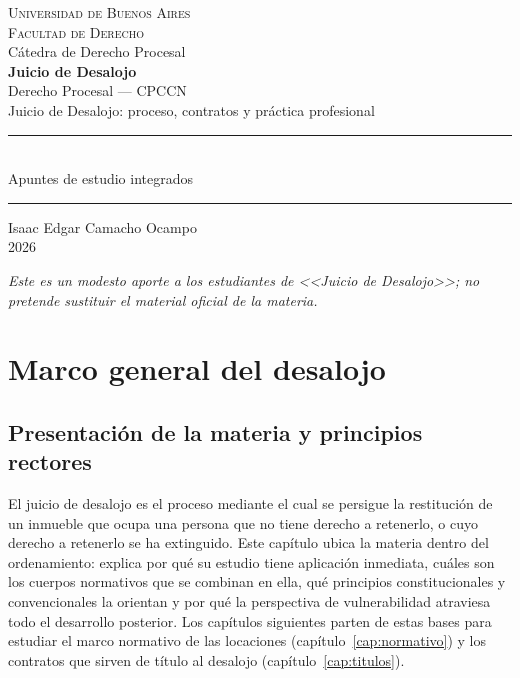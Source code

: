 \documentclass[12pt,oneside]{book}
\newcommand{\universidad}{Universidad de Buenos Aires}
\newcommand{\facultad}{Facultad de Derecho}
\newcommand{\catedra}{Cátedra de Derecho Procesal}
\newcommand{\materia}{Juicio de Desalojo}
\newcommand{\submateria}{Derecho Procesal --- CPCCN}
\newcommand{\titulo}{Juicio de Desalojo: proceso, contratos y práctica profesional}
\newcommand{\autor}{Isaac Edgar Camacho Ocampo}
\newcommand{\anio}{2026}
\begin{document}
\begin{titlepage}
\thispagestyle{empty}
\begin{center}
\vspace*{1cm}
{\large \textsc{\universidad}}\\[0.2cm]
{\large \textsc{\facultad}}\\[0.2cm]
{\large \catedra}\\[3cm]
{\Huge \textbf{\materia}}\\[0.4cm]
{\normalsize \submateria}\\[1cm]
{\LARGE \titulo}\\[1.2cm]
\rule{0.70\textwidth}{0.5pt}\\[0.5cm]
{\large Apuntes de estudio integrados}\\[0.5cm]
\rule{0.70\textwidth}{0.5pt}
\vfill
{\large \autor}\\[0.3cm]
{\large \anio}
\end{center}
\vfill
\begin{flushleft}
\textit{Este es un modesto aporte a los estudiantes de <<\materia>>; no pretende sustituir el material oficial de la materia.}
\end{flushleft}
\end{titlepage}

\frontmatter
\tableofcontents

\mainmatter
\part{Marco general del desalojo}

\chapter{Presentación de la materia y principios rectores}\label{cap:principios}

El juicio de desalojo es el proceso mediante el cual se persigue la restitución de un inmueble que ocupa una persona que no tiene derecho a retenerlo, o cuyo derecho a retenerlo se ha extinguido. Este capítulo ubica la materia dentro del ordenamiento: explica por qué su estudio tiene aplicación inmediata, cuáles son los cuerpos normativos que se combinan en ella, qué principios constitucionales y convencionales la orientan y por qué la perspectiva de vulnerabilidad atraviesa todo el desarrollo posterior. Los capítulos siguientes parten de estas bases para estudiar el marco normativo de las locaciones (capítulo~\ref{cap:normativo}) y los contratos que sirven de título al desalojo (capítulo~\ref{cap:titulos}).
\end{document}
